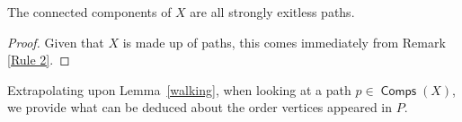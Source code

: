 \documentclass{article}
\DeclareMathOperator{\Comp}{\bm{\mathsf{Comps}}}
\newcommand{\dc}[1]{}%
\begin{document}
\begin{cor} \label{exitless rule} The connected components of $X$\dc{ I would replace all instances of $X$ around this lemma with $F(P)$, or else state explicitly that $X$ now always refers to $F(P)$, preferably still changing the symbol because you use $X$ to mean something different in previous sections.} are all strongly exitless paths. 

\begin{proof} Given that $X$ is made up of paths, this comes immediately from Remark \ref{Rule 2}.\end{proof} 
\end{cor}

Extrapolating upon Lemma~\ref{walking}, when looking at a path $p \in \Comp(X)$, we provide what can be deduced about the order vertices appeared in $P$.   
\end{document}
